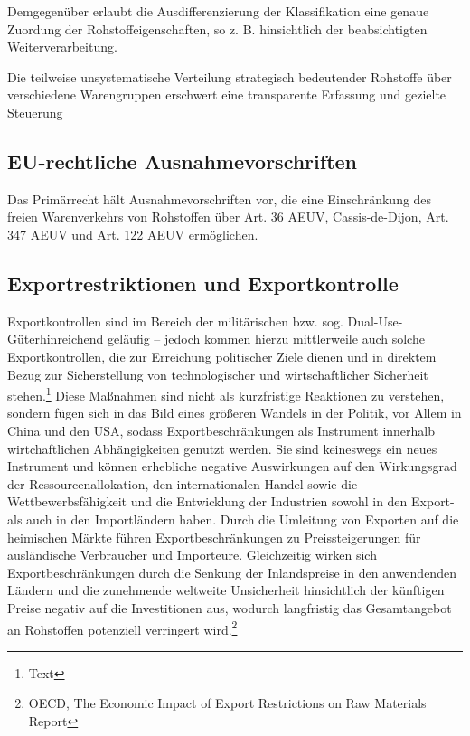 \documentclass[12pt,a4paper,oneside]{book} %
\begin{document}
Demgegenüber erlaubt die Ausdifferenzierung der Klassifikation eine genaue Zuordung der Rohstoffeigenschaften, so z. B. hinsichtlich der beabsichtigten Weiterverarbeitung.\autocite{Schorkopf, Rohstoffverwaltung, Rn. 8.}

Die teilweise unsystematische Verteilung strategisch bedeutender Rohstoffe über verschiedene Warengruppen erschwert eine transparente Erfassung und gezielte Steuerung

\subsection{EU-rechtliche Ausnahmevorschriften}

Das Primärrecht hält Ausnahmevorschriften vor, die eine Einschränkung des freien Warenverkehrs von Rohstoffen über Art. 36 AEUV, Cassis-de-Dijon, Art. 347 AEUV und Art. 122 AEUV ermöglichen.\autocite{Schorkopf, Rohstoffverwaltung, Rn. 10}


\subsection{Exportrestriktionen und Exportkontrolle}

Exportkontrollen sind im Bereich der militärischen bzw. sog. \glqq Dual-Use-Güter\grqq hinreichend geläufig -- jedoch kommen hierzu mittlerweile auch solche Exportkontrollen, die zur Erreichung politischer Ziele dienen und in direktem Bezug zur Sicherstellung von technologischer und wirtschaftlicher Sicherheit stehen.\footnote{Text} Diese Maßnahmen sind nicht als kurzfristige Reaktionen zu verstehen, sondern fügen sich in das Bild eines größeren Wandels in der Politik, vor Allem in China und den USA, sodass Exportbeschränkungen als Instrument innerhalb wirtchaftlichen Abhängigkeiten genutzt werden. Sie sind keineswegs ein neues Instrument und können erhebliche negative Auswirkungen auf den Wirkungsgrad der Ressourcenallokation, den internationalen Handel sowie die Wettbewerbsfähigkeit und die Entwicklung der Industrien sowohl in den Export- als auch in den Importländern haben. Durch die Umleitung von Exporten auf die heimischen Märkte führen Exportbeschränkungen zu Preissteigerungen für ausländische Verbraucher und Importeure. Gleichzeitig wirken sich Exportbeschränkungen durch die Senkung der Inlandspreise in den anwendenden Ländern und die zunehmende weltweite Unsicherheit hinsichtlich der künftigen Preise negativ auf die Investitionen aus, wodurch langfristig das Gesamtangebot an Rohstoffen potenziell verringert wird.\footnote{OECD, The Economic Impact of Export Restrictions on Raw Materials Report}
\end{document}
